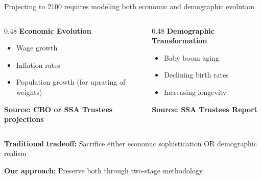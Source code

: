 \documentclass[11pt,aspectratio=169]{beamer}
\begin{document}
\begin{frame}{Projecting to 2100 requires modeling both economic and demographic evolution}

\vspace{0.3cm}

\begin{columns}
\begin{column}{0.48\textwidth}
\textbf{Economic Evolution}
\begin{itemize}
    \item Wage growth
    \item Inflation rates 
    \item Population growth (for uprating of weights) 
\end{itemize}

\vspace{0.2cm}
\textcolor{policygreen}{\textbf{Source: CBO or SSA Trustees projections}}
\end{column}

\begin{column}{0.48\textwidth}
\textbf{Demographic Transformation}
\begin{itemize}
    \item Baby boom aging
    \item Declining birth rates
    \item Increasing longevity
\end{itemize}

\vspace{0.2cm}
\textcolor{peteal}{\textbf{Source: SSA Trustees Report}}
\end{column}
\end{columns}

\vspace{0.3cm}

\begin{center}
\end{center}

\vspace{0.1cm}
\textbf{Traditional tradeoff:} Sacrifice either economic sophistication OR demographic realism

\textbf{Our approach:} Preserve both through two-stage methodology
\end{frame}
\end{document}
